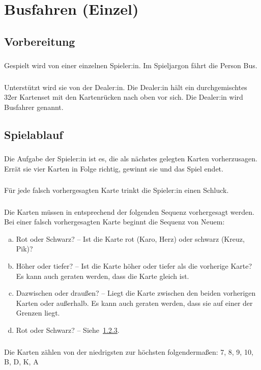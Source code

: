 \section{Busfahren (Einzel)}\label{Busfahren_solo}
\subsection{Vorbereitung}
\subsubsection{}
Gespielt wird von einer einzelnen Spieler:in.
Im Spieljargon \glqq{} fährt die Person Bus\grqq{}.

\subsubsection{}
Unterstützt wird sie von der Dealer:in.
Die Dealer:in hält ein durchgemischtes 32er Kartenset mit den Kartenrücken nach oben vor sich.
Die Dealer:in wird \glqq{} Busfahrer\grqq{} genannt.

\subsection{Spielablauf}
\subsubsection{}
Die Aufgabe der Spieler:in ist es, die als nächstes gelegten Karten vorherzusagen.
Errät sie vier Karten in Folge richtig, gewinnt sie und das Spiel endet.

\subsubsection{}
Für jede falsch vorhergesagten Karte trinkt die Spieler:in einen Schluck.

\subsubsection{}\label{Busfahren_solo:Spielablauf:Fragen:RS}
Die Karten müssen in entsprechend der folgenden Sequenz vorhergesagt werden.
Bei einer falsch vorhergesagten Karte beginnt die Sequenz von Neuem:

\begin{enumerate}[a.]
    \item Rot oder Schwarz? – Ist die Karte rot (Karo, Herz) oder schwarz (Kreuz, Pik)?
    \item Höher oder tiefer? – Ist die Karte höher oder tiefer als die vorherige Karte?
    Es kann auch geraten werden, dass die Karte gleich ist.
    \item Dazwischen oder draußen? – Liegt die Karte zwischen den beiden vorherigen Karten oder außerhalb.
    Es kann auch geraten werden, dass sie auf einer der Grenzen liegt.
    \item Rot oder Schwarz? – Siehe~\ref{Busfahren_solo:Spielablauf:Fragen:RS}.
\end{enumerate}

\subsubsection{}
Die Karten zählen von der niedrigsten zur höchsten folgendermaßen: 7, 8, 9, 10, B, D, K, A
